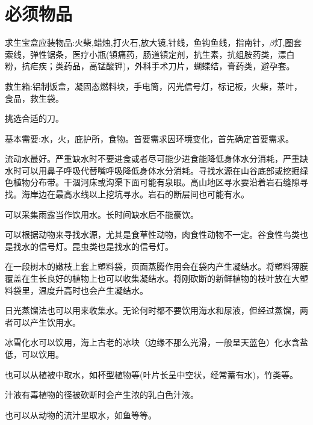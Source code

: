 \section{必须物品}
求生宝盒应装物品:火柴,蜡烛,打火石,放大镜,针线，鱼钩鱼线，指南针，$\beta$灯,圈套索线，弹性锯条，医疗小瓶(镇痛药，肠道镇定剂，抗生素，抗组胺药类，漂白粉，抗疟疾；类药品，高锰酸钾)，外科手术刀片，蝴蝶结，膏药类，避孕套。\par
救生箱:铝制饭盒，凝固态燃料块，手电筒，闪光信号灯，标记板，火柴，茶叶，食品，救生袋。\par
挑选合适的刀。\par
基本需要:水，火，庇护所，食物。首要需求因环境变化，首先确定首要需求。\par
流动水最好。严重缺水时不要进食或者尽可能少进食能降低身体水分消耗，严重缺水时可以用鼻子呼吸代替嘴呼吸降低身体水分消耗。寻找水源在山谷底部或挖掘绿色植物分布带。干涸河床或沟渠下面可能有泉眼。高山地区寻水要沿着岩石缝隙寻找。海岸边在最高水线以上挖坑寻水。岩石的断层间也可能有水。\par
可以采集雨露当作饮用水。长时间缺水后不能豪饮。\par
可以根据动物来寻找水源，尤其是食草性动物，肉食性动物不一定。谷食性鸟类也是找水的信号灯。昆虫类也是找水的信号灯。\par
在一段树木的嫩枝上套上塑料袋，页面蒸腾作用会在袋内产生凝结水。将塑料薄膜覆盖在生长良好的植物上也可以收集凝结水。将刚砍断的新鲜植物的枝叶放在大塑料袋里，温度升高时也会产生凝结水。\par
日光蒸馏法也可以用来收集水。无论何时都不要饮用海水和尿液，但经过蒸馏，两者可以产生饮用水。\par
冰雪化水可以饮用，海上古老的冰块（边缘不那么光滑，一般呈天蓝色）化水含盐低，可以饮用。\par
也可以从植被中取水，如杯型植物等(叶片长呈中空状，经常蓄有水)，竹类等。\par
汁液有毒植物的径被砍断时会产生浓的乳白色汁液。\par
也可以从动物的流汁里取水，如鱼等等。\par





